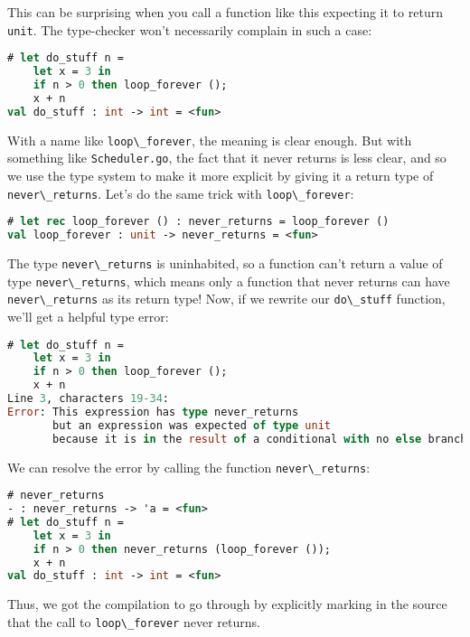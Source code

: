 This can be surprising when you call a function like this expecting it
to return \passthrough{\lstinline!unit!}. The type-checker won't
necessarily complain in such a case:

\begin{lstlisting}[language=Caml]
# let do_stuff n =
    let x = 3 in
    if n > 0 then loop_forever ();
    x + n
val do_stuff : int -> int = <fun>
\end{lstlisting}

With a name like \passthrough{\lstinline!loop\_forever!}, the meaning is
clear enough. But with something like
\passthrough{\lstinline!Scheduler.go!}, the fact that it never returns
is less clear, and so we use the type system to make it more explicit by
giving it a return type of \passthrough{\lstinline!never\_returns!}.
Let's do the same trick with \passthrough{\lstinline!loop\_forever!}:

\begin{lstlisting}[language=Caml]
# let rec loop_forever () : never_returns = loop_forever ()
val loop_forever : unit -> never_returns = <fun>
\end{lstlisting}

The type \passthrough{\lstinline!never\_returns!} is uninhabited, so a
function can't return a value of type
\passthrough{\lstinline!never\_returns!}, which means only a function
that never returns can have \passthrough{\lstinline!never\_returns!} as
its return type! Now, if we rewrite our
\passthrough{\lstinline!do\_stuff!} function, we'll get a helpful type
error:

\begin{lstlisting}[language=Caml]
# let do_stuff n =
    let x = 3 in
    if n > 0 then loop_forever ();
    x + n
Line 3, characters 19-34:
Error: This expression has type never_returns
       but an expression was expected of type unit
       because it is in the result of a conditional with no else branch
\end{lstlisting}

We can resolve the error by calling the function
\passthrough{\lstinline!never\_returns!}:

\begin{lstlisting}[language=Caml]
# never_returns
- : never_returns -> 'a = <fun>
# let do_stuff n =
    let x = 3 in
    if n > 0 then never_returns (loop_forever ());
    x + n
val do_stuff : int -> int = <fun>
\end{lstlisting}

Thus, we got the compilation to go through by explicitly marking in the
source that the call to \passthrough{\lstinline!loop\_forever!} never
returns.

